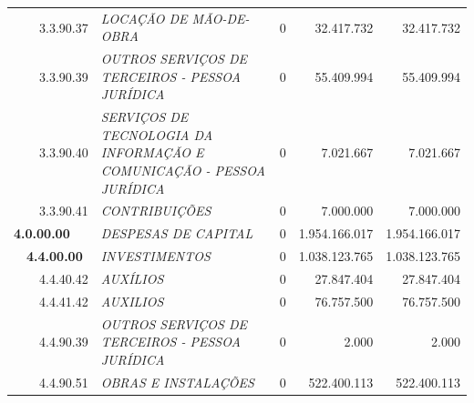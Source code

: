 \documentclass{article}
\begin{document}
\begin{longtable}[c]{m{0.1cm}m{0.1cm}m{0.8cm}|m{8cm}|m{2cm}|m{2cm}|m{2cm}}
\multicolumn{1}{l}{} & \multicolumn{1}{l}{} & \multicolumn{1}{l|}{3.3.90.37} & \multicolumn{1}{L{8cm}|}{\textit{LOCAÇÃO DE MÃO-DE-OBRA}} & \multicolumn{1}{r|}{0} & \multicolumn{1}{r|}{32.417.732} &  \multicolumn{1}{r}{32.417.732}\\
\multicolumn{1}{l}{} & \multicolumn{1}{l}{} & \multicolumn{1}{l|}{3.3.90.39} & \multicolumn{1}{L{8cm}|}{\textit{OUTROS SERVIÇOS DE TERCEIROS - PESSOA JURÍDICA}} & \multicolumn{1}{r|}{0} & \multicolumn{1}{r|}{55.409.994} &  \multicolumn{1}{r}{55.409.994}\\
\multicolumn{1}{l}{} & \multicolumn{1}{l}{} & \multicolumn{1}{l|}{3.3.90.40} & \multicolumn{1}{L{8cm}|}{\textit{SERVIÇOS DE TECNOLOGIA DA INFORMAÇÃO E COMUNICAÇÃO -  PESSOA JURÍDICA}} & \multicolumn{1}{r|}{0} & \multicolumn{1}{r|}{7.021.667} &  \multicolumn{1}{r}{7.021.667}\\
\multicolumn{1}{l}{} & \multicolumn{1}{l}{} & \multicolumn{1}{l|}{3.3.90.41} & \multicolumn{1}{L{8cm}|}{\textit{CONTRIBUIÇÕES}} & \multicolumn{1}{r|}{0} & \multicolumn{1}{r|}{7.000.000} &  \multicolumn{1}{r}{7.000.000}\\
\multicolumn{3}{l|}{\textbf{4.0.00.00}} & \multicolumn{1}{L{8cm}|}{\textit{DESPESAS DE CAPITAL}} & \multicolumn{1}{r|}{0} & \multicolumn{1}{r|}{1.954.166.017} &  \multicolumn{1}{r}{1.954.166.017}\\
\multicolumn{1}{l}{} & \multicolumn{2}{l|}{\textbf{4.4.00.00}} & \multicolumn{1}{L{8cm}|}{\textit{INVESTIMENTOS}} & \multicolumn{1}{r|}{0} & \multicolumn{1}{r|}{1.038.123.765} &  \multicolumn{1}{r}{1.038.123.765}\\
\multicolumn{1}{l}{} & \multicolumn{1}{l}{} & \multicolumn{1}{l|}{4.4.40.42} & \multicolumn{1}{L{8cm}|}{\textit{AUXÍLIOS}} & \multicolumn{1}{r|}{0} & \multicolumn{1}{r|}{27.847.404} &  \multicolumn{1}{r}{27.847.404}\\
\multicolumn{1}{l}{} & \multicolumn{1}{l}{} & \multicolumn{1}{l|}{4.4.41.42} & \multicolumn{1}{L{8cm}|}{\textit{AUXILIOS}} & \multicolumn{1}{r|}{0} & \multicolumn{1}{r|}{76.757.500} &  \multicolumn{1}{r}{76.757.500}\\
\multicolumn{1}{l}{} & \multicolumn{1}{l}{} & \multicolumn{1}{l|}{4.4.90.39} & \multicolumn{1}{L{8cm}|}{\textit{OUTROS SERVIÇOS DE TERCEIROS - PESSOA JURÍDICA}} & \multicolumn{1}{r|}{0} & \multicolumn{1}{r|}{2.000} &  \multicolumn{1}{r}{2.000}\\
\multicolumn{1}{l}{} & \multicolumn{1}{l}{} & \multicolumn{1}{l|}{4.4.90.51} & \multicolumn{1}{L{8cm}|}{\textit{OBRAS E INSTALAÇÕES}} & \multicolumn{1}{r|}{0} & \multicolumn{1}{r|}{522.400.113} &  \multicolumn{1}{r}{522.400.113}\\

\end{longtable}
\end{document}
